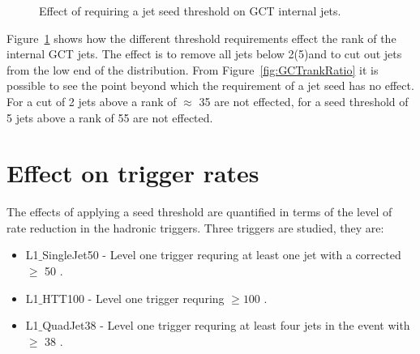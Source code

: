 \begin{figure}[h!]
    \centering
    \caption{Effect of requiring a jet seed threshold on GCT internal jets.}
    \label{fig:GCTrank}
\end{figure}


Figure~\ref{fig:GCTrank} shows how the different threshold requirements effect 
the rank of the internal GCT jets. The effect is to remove all jets below 
2(5)\GeV and to cut out jets from the low end of the distribution. From 
Figure~\ref{fig:GCTrankRatio} it is possible to see the point beyond which the 
requirement of a jet seed has no effect. For a cut of 2 \GeV jets above a rank 
of $\approx$ 35 are not effected, for a seed threshold of 5 \GeV jets above a 
rank of 55 are not effected.


\section{Effect on trigger rates} %
\label{sec:Effects on Rate}
The effects of applying a seed threshold are quantified in terms of the level of rate
reduction in the \Lone hadronic triggers.
Three triggers are studied, they are:
\begin{itemize}
  \item L1$\_$SingleJet50 - Level one trigger requring at least one jet with a 
  corrected \ET $\geq$ 50 \GeV.
  \item L1$\_$HTT100 - Level one trigger requring \HT $\geq 100$ \GeV.
  \item L1$\_$QuadJet38 - Level one trigger requring at least four jets in the 
  event with \ET $\geq$ 38 \GeV.

\end{itemize}
